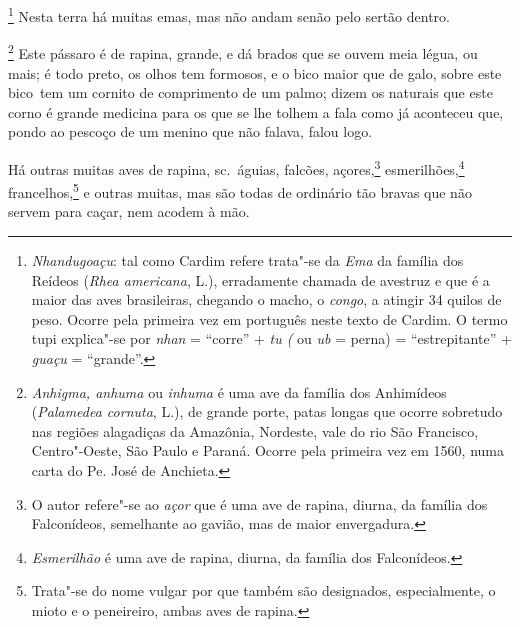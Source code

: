 \begin{linenumbers}
\footnote{ \textit{Nhandugoaçu}: tal como Cardim
refere trata"-se da \textit{Ema} da família dos Reídeos (\textit{Rhea
americana}, L.), erradamente chamada de avestruz e que é a maior das aves
brasileiras, chegando o macho, o \textit{congo}, a atingir 34 quilos de
peso. Ocorre pela primeira vez em português neste texto de Cardim. O
termo tupi explica"-se por \textit{nhan} = ``corre'' + \textit{tu (} ou
\textit{ub} = perna) = ``estrepitante'' + \textit{guaçu} = ``grande''.} 
Nesta terra há muitas emas, mas não andam senão pelo sertão dentro. 

\footnote{ \textit{Anhigma, anhuma} ou \textit{inhuma}
é uma ave da família dos Anhimídeos (\textit{Palamedea cornuta}, L.), 
de grande porte, patas longas que ocorre sobretudo nas regiões
alagadiças da Amazônia, Nordeste, vale do rio São Francisco,
Centro"-Oeste, São Paulo e Paraná. Ocorre pela primeira vez em 1560,
numa carta do Pe. José de Anchieta.} Este pássaro
é de rapina, grande, e dá brados que se ouvem meia légua, ou mais; é
todo preto, os olhos tem formosos, e o bico maior que de galo, sobre
este \mbox{bico tem} um cornito de comprimento de um palmo; dizem os naturais
que este corno é grande medicina para os que se lhe tolhem a fala como
já aconteceu que, pondo ao pescoço de um menino que não falava, falou logo.

 Há outras muitas aves de rapina, sc.~águias, falcões, 
açores,\footnote{ O autor refere"-se ao \textit{açor} que é uma ave de rapina,
diurna, da família dos Falconídeos, semelhante ao gavião, mas de maior
envergadura.} esmerilhões,\footnote{ \textit{Esmerilhão} é uma ave
de rapina, diurna, da família dos Falconídeos.} 
francelhos,\footnote{ Trata"-se do nome vulgar por que também são designados, especialmente, o
mioto e o peneireiro, ambas aves de rapina.} e outras muitas, mas são
todas de ordinário tão bravas que não servem para caçar, nem acodem à mão.


\end{linenumbers}
